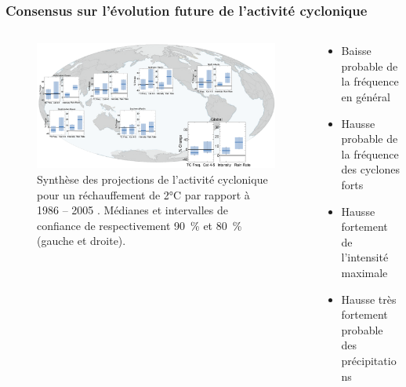 \documentclass[aspectratio=169, usepdftitle=false, xcolor={dvipsnames}, 9pt]{beamer}
\begin{document}
\begin{frame}[c]
    \frametitle{Consensus sur l'évolution future de l'activité cyclonique}
    \begin{columns}
        \begin{column}{0.75\textwidth}
            \begin{figure}[h]
                \centering
                \includegraphics[width=\textwidth]{Figures/knutson_2020_projections_cropped.png}
                \caption{Synthèse des projections de l'activité cyclonique pour un réchauffement de 2°C par rapport à 1986 -- 2005
                \parencite{knutson_tropical_2020}. Médianes et intervalles de confiance de respectivement 90~\% et 80~\% (gauche et droite).}
            \end{figure}
        \end{column}
        \begin{column}{0.25\textwidth}
           \footnotesize
           \setlength{\leftmargini}{2.5ex}
           \begin{block}[Résumé]
               \scriptsize
               \begin{itemize}
                    \item Baisse probable de la fréquence en général 
                    \item Hausse probable de la fréquence des cyclones forts
                    \item Hausse fortement de l'intensité maximale
                    \item Hausse très fortement probable des précipitations
               \end{itemize}
           \end{block}
        \end{column}
    \end{columns}
\end{frame}
\end{document}
